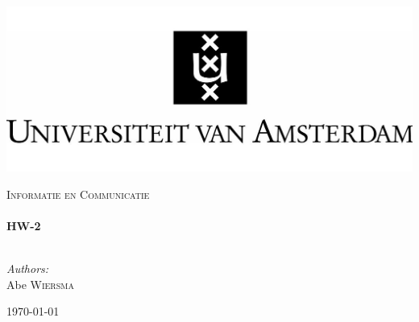 \begin{titlepage}

\begin{flushleft}
\includegraphics[trim=0mm 0mm 0mm 0mm, width=1\textwidth]{./logo.jpg}\\
\end{flushleft}
\begin{center}
	\textsc{\Large Informatie en Communicatie}\\[0.5cm]

    \HRule \\[0.4cm] { \huge \bfseries HW-2}\\[0.4cm]

    \HRule \\[1.5cm]

\begin{minipage}{0.4\textwidth}
\begin{flushleft} \large \emph{Authors:}\\
Abe \textsc{Wiersma}\\
\end{flushleft}
\end{minipage}
\begin{minipage}{0.4\textwidth} \begin{flushright} \large \end{flushright}\end{minipage}

    \vfill

    {\large \today}

\end{center}
\end{titlepage}
\pagebreak